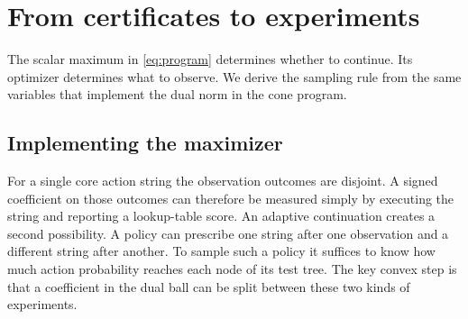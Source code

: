\section{From certificates to experiments}\label{sec:diagnostic}
The scalar maximum in \eqref{eq:program} determines whether to continue. Its optimizer determines what to observe. We derive the sampling rule from the same variables that implement the dual norm in the cone program.

\subsection{Implementing the maximizer}
For a single core action string the observation outcomes are disjoint. A signed coefficient on those outcomes can therefore be measured simply by executing the string and reporting a lookup-table score. An adaptive continuation creates a second possibility. A policy can prescribe one string after one observation and a different string after another. To sample such a policy it suffices to know how much action probability reaches each node of its test tree. The key convex step is that a coefficient in the dual ball can be split between these two kinds of experiments.

